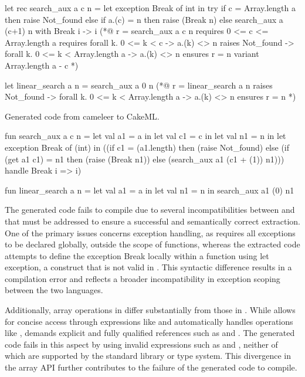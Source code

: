 \begin{gospell}
let rec search_aux a c n =
    let exception Break of int in try
        if c = Array.length a then raise Not_found else if a.(c) = n 
        then raise (Break n) else search_aux a (c+1) n
    with Break i -> i
(*@
    r = search_aux a c n
    requires 0 <= c <= Array.length a
    requires forall k. 0 <= k < c -> a.(k) <> n
    raises Not_found -> forall k. 0 <= k < Array.length a -> a.(k) <> n
    ensures r = n
    variant Array.length a - c
*)

let linear_search a n = search_aux a 0 n
(*@
    r = linear_search a n
    raises Not_found -> forall k. 0 <= k < Array.length a -> a.(k) <> n
    ensures r = n
*)
\end{gospell}

Generated code from cameleer to CakeML.

\begin{cakeml}
fun search_aux a c n = let val a1 = a in
  let val c1 = c in
  let val n1 = n in
  let exception Break of (int) in
  ((if c1 = (a1.length) then (raise Not_found) 
    else (if (get a1 c1) = n1 then (raise (Break n1)) 
          else (search_aux a1 (c1 + (1)) n1)))
  handle   Break i => i)

fun linear_search a n =
  let val a1 = a in let val n1 = n in search_aux a1 (0) n1
\end{cakeml}

The generated \cml code fails to compile due to several incompatibilities between \ocaml and \cml that must be addressed 
to ensure a successful and semantically correct extraction. One of the primary issues concerns exception handling, as \cml 
requires all exceptions to be declared globally, outside the scope of functions, whereas the extracted code attempts to define 
the exception Break locally within a function using let exception, a construct that is not valid in \cml. This syntactic 
difference results in a compilation error and reflects a broader incompatibility in exception scoping between the two languages.

Additionally, array operations in \cml differ substantially from those in \ocaml. While \ocaml allows for concise access through 
expressions like  and automatically handles operations like , \cml demands explicit 
and fully qualified references such as  and . The generated code fails 
in this aspect by using invalid expressions such as  and , neither of which are 
supported by the \cml standard library or type system. This divergence in the array API further contributes to the failure of 
the generated code to compile.

